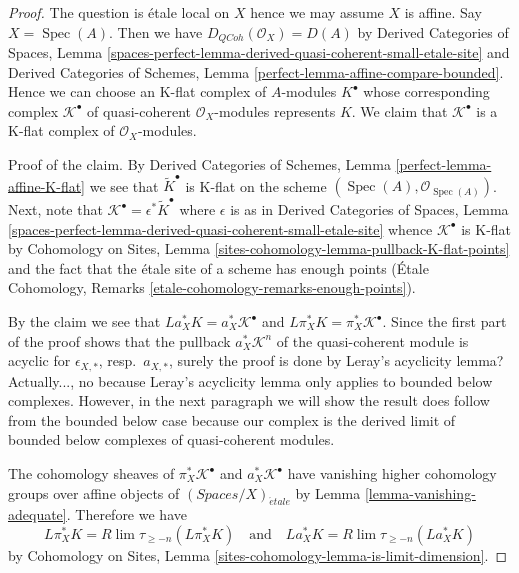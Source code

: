 \documentclass{stacks-project}
\theoremstyle{plain}
\theoremstyle{definition}
\theoremstyle{remark}
\numberwithin{equation}{subsection}
\def\lim{\mathop{\mathrm{lim}}\nolimits}
\def\Spec{\mathop{\mathrm{Spec}}}
\def\etale{{\acute{e}tale}}
\def\QCoh{\mathit{QCoh}}
\begin{document}
\begin{proof}
The question is \'etale local on $X$ hence we may assume $X$ is affine.
Say $X = \Spec(A)$. Then we have $D_\QCoh(\mathcal{O}_X) = D(A)$ by
Derived Categories of Spaces, Lemma
\ref{spaces-perfect-lemma-derived-quasi-coherent-small-etale-site}
and
Derived Categories of Schemes, Lemma
\ref{perfect-lemma-affine-compare-bounded}.
Hence we can choose an K-flat complex of $A$-modules
$K^\bullet$ whose corresponding complex
$\mathcal{K}^\bullet$ of quasi-coherent $\mathcal{O}_X$-modules
represents $K$.
We claim that $\mathcal{K}^\bullet$ is a K-flat complex
of $\mathcal{O}_X$-modules.

\medskip\noindent
Proof of the claim. By
Derived Categories of Schemes, Lemma
\ref{perfect-lemma-affine-K-flat}
we see that $\widetilde{K}^\bullet$ is K-flat on the scheme
$(\Spec(A), \mathcal{O}_{\Spec(A)})$.
Next, note that $\mathcal{K}^\bullet = \epsilon^*\widetilde{K}^\bullet$
where $\epsilon$ is as in Derived Categories of Spaces, Lemma
\ref{spaces-perfect-lemma-derived-quasi-coherent-small-etale-site}
whence $\mathcal{K}^\bullet$ is K-flat by
Cohomology on Sites, Lemma \ref{sites-cohomology-lemma-pullback-K-flat-points}
and the fact that the \'etale site of a scheme has enough points
(\'Etale Cohomology, Remarks \ref{etale-cohomology-remarks-enough-points}).

\medskip\noindent
By the claim we see that
$La_X^*K = a_X^*\mathcal{K}^\bullet$ and
$L\pi_X^*K = \pi_X^*\mathcal{K}^\bullet$.
Since the first part of the proof shows that the pullback
$a_X^*\mathcal{K}^n$ of the quasi-coherent module
is acyclic for $\epsilon_{X, *}$, resp.\ $a_{X, *}$, surely the proof is done
by Leray's acyclicity lemma? Actually..., no because Leray's
acyclicity lemma only applies to bounded below complexes.
However, in the next paragraph we will show the result does follow
from the bounded below case because our complex is the derived limit
of bounded below complexes of quasi-coherent modules.

\medskip\noindent
The cohomology sheaves of
$\pi_X^*\mathcal{K}^\bullet$ and $a_X^*\mathcal{K}^\bullet$
have vanishing higher cohomology
groups over affine objects of $(\textit{Spaces}/X)_\etale$ by
Lemma \ref{lemma-vanishing-adequate}.
Therefore we have
$$
L\pi_X^*K = R\lim \tau_{\geq -n}(L\pi_X^*K)
\quad\text{and}\quad
La_X^*K = R\lim \tau_{\geq -n}(La_X^*K)
$$
by Cohomology on Sites, Lemma \ref{sites-cohomology-lemma-is-limit-dimension}.


\end{proof}
\end{document}
